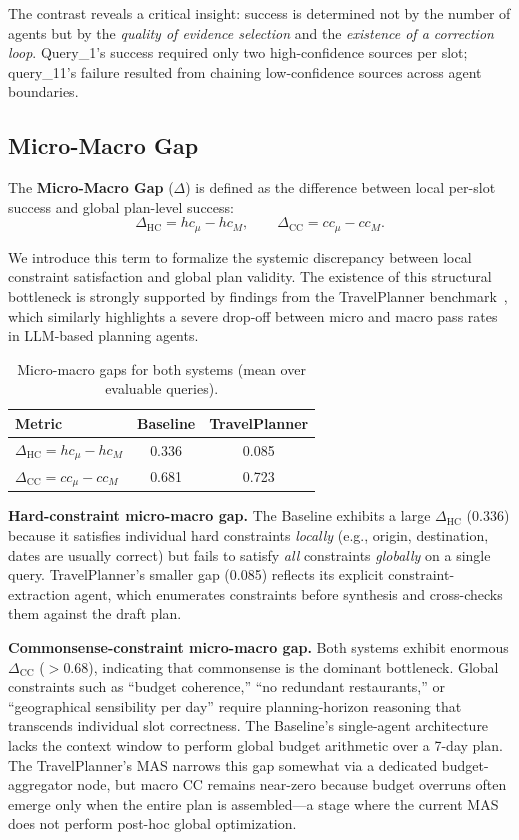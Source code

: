 \documentclass[a4paper,oneside,bibliography=totoc]{scrbook}
\begin{document}
The contrast reveals a critical insight: success is determined not by the number of agents but by the \emph{quality of evidence selection} and the \emph{existence of a correction loop}. Query\_1's success required only two high-confidence sources per slot; query\_11's failure resulted from chaining low-confidence sources across agent boundaries.

\subsection{Micro-Macro Gap}
\label{subsec:micro-macro}

The \textbf{Micro-Macro Gap} ($\Delta$) is defined as the difference between local per-slot success and global plan-level success:
$$
\Delta_{\text{HC}} = hc_\mu - hc_M, \qquad \Delta_{\text{CC}} = cc_\mu - cc_M.
$$

We introduce this term to formalize the systemic discrepancy between local constraint satisfaction and global plan validity. The existence of this structural bottleneck is strongly supported by findings from the TravelPlanner benchmark~\cite{travelplanner}, which similarly highlights a severe drop-off between micro and macro pass rates in LLM-based planning agents.

\begin{table}[htbp]
\centering
\caption{Micro-macro gaps for both systems (mean over evaluable queries).}
\label{tab:micro-macro}
\begin{tabular}{@{}lcc@{}}
\toprule
\textbf{Metric} & \textbf{Baseline} & \textbf{TravelPlanner} \\
\midrule
$\Delta_{\text{HC}} = hc_\mu - hc_M$ & 0.336 & 0.085 \\
$\Delta_{\text{CC}} = cc_\mu - cc_M$ & 0.681 & 0.723 \\
\bottomrule
\end{tabular}
\end{table}

\textbf{Hard-constraint micro-macro gap.} The Baseline exhibits a large $\Delta_{\text{HC}}$ (0.336) because it satisfies individual hard constraints \emph{locally} (e.g., origin, destination, dates are usually correct) but fails to satisfy \emph{all} constraints \emph{globally} on a single query. TravelPlanner's smaller gap (0.085) reflects its explicit constraint-extraction agent, which enumerates constraints before synthesis and cross-checks them against the draft plan.

\textbf{Commonsense-constraint micro-macro gap.} Both systems exhibit enormous $\Delta_{\text{CC}}$ ($>$0.68), indicating that commonsense is the dominant bottleneck. Global constraints such as ``budget coherence,'' ``no redundant restaurants,'' or ``geographical sensibility per day'' require planning-horizon reasoning that transcends individual slot correctness. The Baseline's single-agent architecture lacks the context window to perform global budget arithmetic over a 7-day plan. The TravelPlanner's MAS narrows this gap somewhat via a dedicated budget-aggregator node, but macro CC remains near-zero because budget overruns often emerge only when the entire plan is assembled---a stage where the current MAS does not perform post-hoc global optimization.
\end{document}
